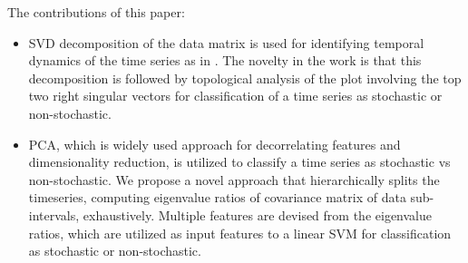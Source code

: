 \documentclass[journal]{IEEEtran}
\begin{document}
	
%	
	 The contributions of this paper:
	\begin{itemize}
		\item SVD decomposition of the data matrix is used for identifying temporal dynamics of the time series as in \cite{misra2006}. The novelty in the work is that this decomposition is followed by topological analysis of the plot involving the top two right singular vectors for classification of a time series as stochastic or non-stochastic. 
		
		\item PCA, which is widely used approach for decorrelating features and dimensionality reduction, is utilized to classify a time series as stochastic vs non-stochastic. We propose a novel approach that hierarchically splits the timeseries, computing eigenvalue ratios of covariance matrix of data sub-intervals, exhaustively. Multiple features are devised from the eigenvalue ratios, which are utilized as input features to a linear SVM for classification as stochastic or non-stochastic.
	\end{itemize}
	
\end{document}
